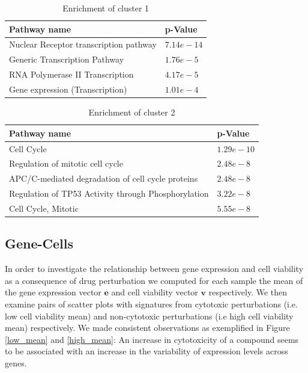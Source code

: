 \documentclass[bsc,frontabs,twoside,singlespacing,parskip,deptreport]{infthesis}     %
\let\Oldsubsection\subsection
\renewcommand{\subsection}{\FloatBarrier\Oldsubsection}
\begin{document}
\begin{table}[h!]

\centering
\begin{tabular}{ll} 
\toprule
Pathway name  & p-Value \\
\midrule
Nuclear Receptor transcription pathway & $7.14e-14$ \\
Generic Transcription Pathway &  $1.76e-5$ \\
RNA Polymerase II  Transcription &  $4.17e-5$ \\
Gene expression (Transcription) &  $1.01e-4$ \\
\bottomrule
\end{tabular}
\caption{Enrichment of cluster 1}\label{c1_enrichment}


\end{table}

\begin{table}[h!]
\centering
\begin{tabular}{ll} 
\toprule
Pathway name & p-Value \\

\midrule
Cell Cycle & $1.29e-10$ \\
Regulation of mitotic cell cycle & $2.48e-8$ \\
APC/C-mediated degradation of  cell cycle proteins & $2.48e-8$ \\
Regulation of TP53 Activity through Phosphorylation & $3.22e-8$ \\
Cell Cycle, Mitotic & $5.55e-8$ \\

\bottomrule
\end{tabular}
\caption{Enrichment of cluster 2}\label{c2_enrichment}
\end{table}


\subsection{Gene-Cells}
In order to investigate the relationship between gene expression and cell viability as a consequence of drug perturbation we computed for each sample the mean of the gene expression vector \(\mathbf{e}\) and cell viability vector \(\mathbf{v}\) respectively. We then examine pairs of scatter plots with signatures from cytotoxic perturbations (i.e. low cell viability mean) and non-cytotoxic perturbations (i.e high cell viability mean) respectively. We made consistent observations as exemplified in Figure \ref{low_mean} and \ref{high_mean}: An increase in cytotoxicity of a compound  seems to be associated with an increase in the variability of expression levels across genes.
\end{document}
